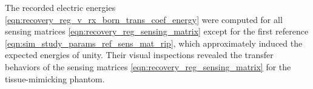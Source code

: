 The recorded electric energies
\eqref{eqn:recovery_reg_v_rx_born_trans_coef_energy} were computed for
all sensing matrices
\eqref{eqn:recovery_reg_sensing_matrix} except for
the first reference
\eqref{eqn:sim_study_params_ref_sens_mat_rip}, which approximately induced
the expected energies of
unity.
Their visual inspections revealed
the transfer behaviors of
the sensing matrices
\eqref{eqn:recovery_reg_sensing_matrix} for
the tissue-mimicking phantom.
